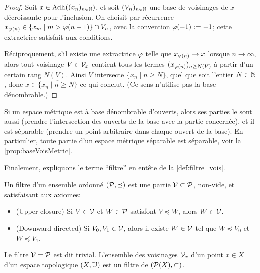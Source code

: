 \begin{proof}
	Soit $x \in \operatorname{Adh}((x_n)_{n \in \mathbb{N}})$, et soit $(V_n)_{n \in \mathbb{N}}$ une base de voisinages de $x$ décroissante pour l'inclusion. On choisit par récurrence $x_{\varphi(n)} \in \{x_m \mid m> \varphi(n-1)\} \cap V_n$, avec la convention $\varphi(-1):=-1$; cette extractrice satisfait aux conditions. 
	
	Réciproquement, s'il existe une extractrice $\varphi$ telle que $x_{\varphi(n)} \to x$ lorsque $n \to \infty$, alors tout voisinage $V \in \mathcal{V}_x$ contient tous les termes $(x_{\varphi(n)})_{n \geq N(V)}$ à partir d'un certain rang $N(V)$. Ainsi $V$ intersecte $\{x_n\mid n \geq N\}$, quel que soit l'entier $N\in \mathbb{N}$, donc $x\in \overline{\{x_n\mid n \geq N\}}$ ce qui conclut. (Ce sens n'utilise pas la base dénombrable.)
\end{proof}

\begin{remark}
\label{rem:separable_partie}
%
	Si un espace métrique est à base dénombrable d'ouverts, alors ses parties le sont aussi (prendre l'intersection des ouverts de la base avec la partie concernée), et il est séparable (prendre un point arbitraire dans chaque ouvert de la base). En particulier, toute partie d'un espace métrique séparable est séparable, voir la \cref{prop:baseVoisMetric}.
\end{remark}


Finalement, expliquons le terme ``filtre'' en entête de la \cref{def:filtre_vois}.

\begin{remark}
\label{rem:axiomFiltre}
%
Un filtre d'un ensemble ordonné $(\mathcal{P}, \preceq)$ est une partie $\mathcal{V} \subset \mathcal{P}$, non-vide, et satisfaisant aux axiomes: 
\begin{itemize}
	\item (Upper closure) Si $V \in \mathcal{V}$ et $W \in \mathcal{P}$ satisfont $V \preceq W$, alors $W \in \mathcal{V}$.
	\item (Downward directed) Si $V_0,V_1 \in \mathcal{V}$, alors il existe $W \in \mathcal{V}$ tel que $W\preceq V_0$ et $W \preceq V_1$.
\end{itemize}
Le filtre $\mathcal{V} = \mathcal{P}$ est dit trivial. 
L'ensemble des voisinages $\mathcal{V}_x$ d'un point $x\in X$ d'un espace topologique $(X, \mathbb{U})$ est un filtre de $(\mathcal{P}(X),\subset)$. 
\end{remark}



